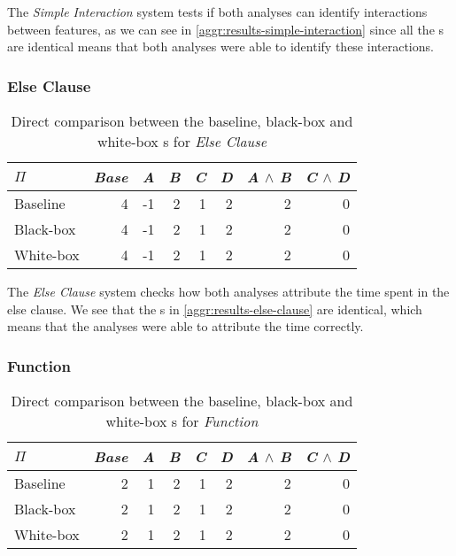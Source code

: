 The \emph{Simple Interaction} system tests if both analyses can identify interactions between features, 
as we can see in \autoref{aggr:results-simple-interaction} since all the {\perfInfluenceModel}s are identical means 
that both analyses were able to identify these interactions.

\subsubsection*{Else Clause}

\begin{table}[H]
    \centering
    \begin{tabular}{lrrrrrrr}
    \toprule
    $\Pi$    & \emph{Base} & \emph{A} & \emph{B} & \emph{C} & \emph{D} & \emph{A} $\land$ \emph{B} & \emph{C} $\land$ \emph{D}  \\ \midrule
    Baseline & 4    & -1 & 2 & 1 & 2 & 2           & 0            \\
    Black-box & 4    & -1 & 2 & 1 & 2 & 2           & 0           \\
    White-box & 4    & -1 & 2 & 1 & 2 & 2           & 0           \\ \bottomrule
    \end{tabular}  
    \caption{Direct comparison between the baseline, black-box and white-box {\perfInfluenceModel}s for \emph{Else Clause}}\label{aggr:results-else-clause}
\end{table}

The \emph{Else Clause} system checks how both analyses attribute the time spent in the else clause. 
We see that the {\perfInfluenceModel}s in \autoref{aggr:results-else-clause} are identical, which means that the analyses were able to attribute the time correctly.

\subsubsection*{Function}

\begin{table}[H]
    \centering
    \begin{tabular}{lrrrrrrr}
    \toprule
    $\Pi$    & \emph{Base} & \emph{A} & \emph{B} & \emph{C} & \emph{D} & \emph{A} $\land$ \emph{B} & \emph{C} $\land$ \emph{D}  \\ \midrule
    Baseline & 2    & 1 & 2 & 1 & 2 & 2           & 0            \\
    Black-box & 2   & 1 & 2 & 1 & 2 & 2           & 0            \\
    White-box & 2   & 1 & 2 & 1 & 2 & 2           & 0            \\ \bottomrule
    \end{tabular}  
    \caption{Direct comparison between the baseline, black-box and white-box {\perfInfluenceModel}s for \emph{Function}}\label{aggr:results-function}
\end{table}

